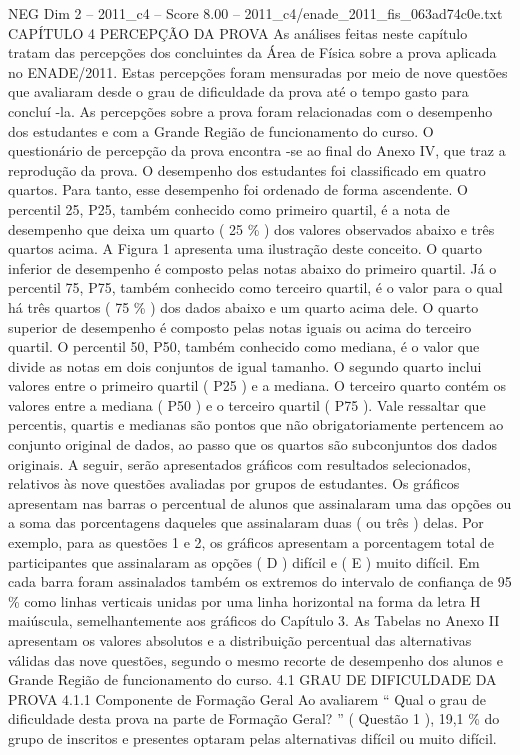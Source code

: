 \begin{textsample}{NEG Dim 2 – 2011\_c4 – Score 8.00 – 2011\_c4/enade\_2011\_fis\_063ad74c0e.txt}  \label{ex:f2_neg_311}
CAPÍTULO 4 PERCEPÇÃO DA PROVA As análises feitas neste capítulo tratam das percepções dos concluintes da Área de Física sobre a prova aplicada no ENADE/2011.
Estas percepções foram mensuradas por meio de nove questões que avaliaram desde o grau de dificuldade da prova até o tempo gasto para concluí -la.
As percepções sobre a prova foram relacionadas com o desempenho dos estudantes e com a Grande Região de funcionamento do curso.
O questionário de percepção da prova encontra -se ao final do Anexo IV, que traz a reprodução da prova.
O desempenho dos estudantes foi classificado em quatro quartos.
Para tanto, esse desempenho foi ordenado de forma ascendente.
O percentil 25, P25, também conhecido como primeiro quartil, é a nota de desempenho que deixa um quarto ( 25 \% ) dos valores observados abaixo e três quartos acima.
A Figura 1 apresenta uma ilustração deste conceito.
O quarto inferior de desempenho é composto pelas notas abaixo do primeiro quartil.
Já o percentil 75, P75, também conhecido como terceiro quartil, é o valor para o qual há três quartos ( 75 \% ) dos dados abaixo e um quarto acima dele.
O quarto superior de desempenho é composto pelas notas iguais ou acima do terceiro quartil.
O percentil 50, P50, também conhecido como mediana, é o valor que divide as notas em dois conjuntos de igual tamanho.
O segundo quarto inclui valores entre o primeiro quartil ( P25 ) e a mediana.
O terceiro quarto contém os valores entre a mediana ( P50 ) e o terceiro quartil ( P75 ).
Vale ressaltar que percentis, quartis e medianas são pontos que não obrigatoriamente pertencem ao conjunto original de dados, ao passo que os quartos são subconjuntos dos dados originais.
A seguir, serão apresentados gráficos com resultados selecionados, relativos às nove questões avaliadas por grupos de estudantes.
Os gráficos apresentam nas barras o percentual de alunos que assinalaram uma das opções ou a soma das porcentagens daqueles que assinalaram duas ( ou três ) delas.
Por exemplo, para as questões 1 e 2, os gráficos apresentam a porcentagem total de participantes que assinalaram as opções ( D ) difícil e ( E ) muito difícil.
Em cada barra foram assinalados também os extremos do intervalo de confiança de 95 \% como linhas verticais unidas por uma linha horizontal na forma da letra H maiúscula, semelhantemente aos gráficos do Capítulo 3.
As Tabelas no Anexo II apresentam os valores absolutos e a distribuição percentual das alternativas válidas das nove questões, segundo o mesmo recorte de desempenho dos alunos e Grande Região de funcionamento do curso. 4.1 GRAU DE DIFICULDADE DA PROVA 4.1.1 Componente de Formação Geral Ao avaliarem “ Qual o grau de dificuldade desta prova na parte de Formação Geral? ” ( Questão 1 ), 19,1 \% do grupo de inscritos e presentes optaram pelas alternativas difícil ou muito difícil.

\end{textsample}
